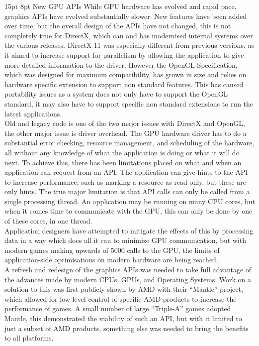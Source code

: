 \documentclass[12pt,a4paper]{article}
\makeatletter
\renewcommand\subsection{\@startsection {subsection}{1}{2mm} %
                               {15pt} %
                               {8pt} %
                               {\fontsize{13pt}{1em}\bfseries}}
\makeatother
\begin{document}
\subsection{New GPU APIs}
While GPU hardware has evolved and rapid pace, graphics APIs have evolved substantially slower. New features have been added over time, but the overall design of the APIs have not changed, this is not completely true for DirectX, which can and has modernised internal systems over the various releases. DirectX 11 was especially different from previous versions, as it aimed to increase support for parallelism by allowing the application to give more detailed information to the driver. 
However the OpenGL Specification, which was designed for maximum compatibility, has grown  in size and relies on hardware specific extension to support non standard features. This has caused portability issues as a system does not only have to support the OpenGL standard, it may also have to support specific non standard extensions to run the latest applications.
\\
Old and legacy code is one of the two major issues with DirectX and OpenGL, the other major issue is driver overhead. The GPU hardware driver has to do a substantial error checking, resource management, and scheduling of the hardware, all without any knowledge of what the application is doing or what it will do next. To achieve this, there has been limitations placed on what and when an application can request from an API. The application can give hints to the API to increase performance, such as marking a resource as read-only, but these are only hints. The true major limitation is that API calls can only be called from a single processing thread. An application may be running on many CPU cores, but when it comes time to communicate with the GPU, this can only be done by one of these cores, in one thread.
\\
Application designers have attempted to mitigate the effects of this by processing data in a way which does all it can to minimize GPU communication, but with modern games making upwards of 5000 calls to the GPU, the limits of application-side optimisations on modern hardware are being reached.
\\
A refresh and redesign of the graphics APIs was needed to take full advantage of the advances made by modern CPUs, GPUs, and Operating Systems. Work on a solution to this was first publicly shown by  AMD with their “Mantle” project, which allowed for low level control of specific AMD products to increase the performance of games. A small number of large “Triple-A”  games adopted Mantle, this demonstrated the viability of such an API, but with it limited to just a subset of AMD products, something else was needed to bring the benefits to all platforms.
\end{document}
